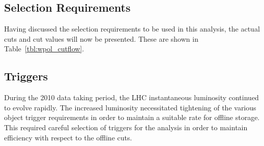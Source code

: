 \subsection{Selection Requirements}
\label{sec:wpol_cutflow}
Having discussed the selection requirements to be used in this analysis, the
actual cuts and cut values will now be presented. These are shown in
Table~\ref{tbl:wpol_cutflow}.



\subsection{Triggers}
During the 2010 data taking period, the \ac{LHC} instantaneous luminosity
continued to evolve rapidly. The increased luminosity necessitated tightening of
the various object trigger requirements in order to maintain a suitable rate for
offline storage. This required careful selection of triggers for the analysis in
order to maintain efficiency with respect to the offline cuts.


